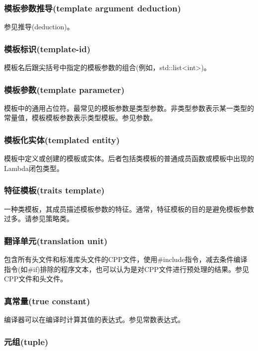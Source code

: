 \subsubsection{模板参数推导(template argument deduction)}

参见推导(deduction)。

\subsubsection{模板标识(template-id)}

模板名后跟尖括号中指定的模板参数的组合(例如，std::list<int>)。

\subsubsection{模板参数(template parameter)}

模板中的通用占位符。最常见的模板参数是类型参数。非类型参数表示某一类型的常量值，模板模板参数表示类型模板。参见参数。

\subsubsection{模板化实体(templated entity)}

模板中定义或创建的模板或实体。后者包括类模板的普通成员函数或模板中出现的Lambda闭包类型。

\subsubsection{特征模板(traits template)}

一种类模板，其成员描述模板参数的特征。通常，特征模板的目的是避免模板参数过多。请参见策略类。

\subsubsection{翻译单元(translation unit)}

包含所有头文件和标准库头文件的CPP文件，使用\#include指令，减去条件编译指令(如\#if)排除的程序文本，也可以认为是对CPP文件进行预处理的结果。参见CPP文件和头文件。

\subsubsection{真常量(true constant)}

编译器可以在编译时计算其值的表达式。参见常数表达式。

\subsubsection{元组(tuple)}

